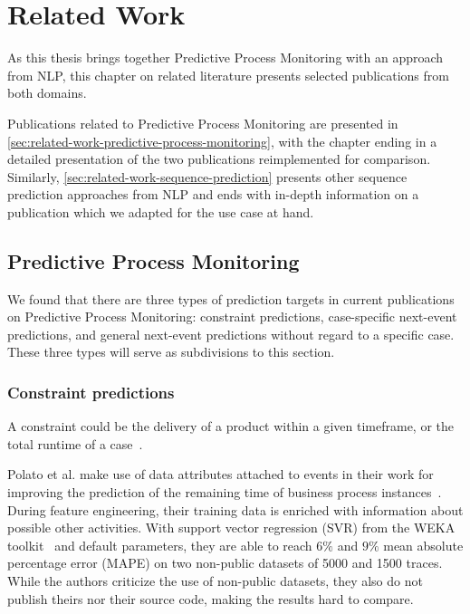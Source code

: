 \chapter{Related Work}\label{chap:related-work}
As this thesis brings together Predictive Process Monitoring with an approach from NLP, this chapter on related literature presents selected publications from both domains.

Publications related to Predictive Process Monitoring are presented in \autoref{sec:related-work-predictive-process-monitoring}, with the chapter ending in a detailed presentation of the two publications reimplemented for comparison. Similarly, \autoref{sec:related-work-sequence-prediction} presents other sequence prediction approaches from NLP and ends with in-depth information on a publication which we adapted for the use case at hand.

\section{Predictive Process Monitoring}\label{sec:related-work-predictive-process-monitoring}
We found that there are three types of prediction targets in current publications on Predictive Process Monitoring: constraint predictions, case-specific next-event predictions, and general next-event predictions without regard to a specific case. These three types will serve as subdivisions to this section.

\subsection*{Constraint predictions}
A constraint could be the delivery of a product within a given timeframe, or the total runtime of a case~\cite{weske2012business, francescomarino2015}.

Polato et al. make use of data attributes attached to events in their work for improving the prediction of the remaining time of business process instances~\cite{polato2014}. During feature engineering, their training data is enriched with information about possible other activities. With support vector regression (SVR) from the WEKA toolkit~\cite{web:weka} and default parameters, they are able to reach $6\%$ and $9\%$ mean absolute percentage error (MAPE) on two non-public datasets of 5000 and 1500 traces. While the authors criticize the use of non-public datasets, they also do not publish theirs nor their source code, making the results hard to compare.\\


